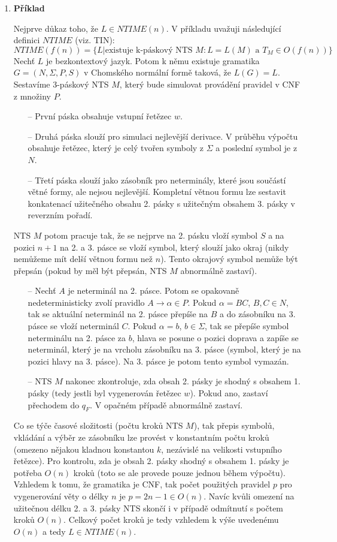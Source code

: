 \documentclass[a4paper,12pt]{article}
\begin{document}
\begin{enumerate}[label=\textbf{\arabic*}.]
 \enlargethispage{5em}
  \item {\bfseries Příklad}
  
   Nejprve důkaz toho, že $L \in NTIME(n)$. V příkladu uvažuji následující definici $NTIME$ (viz. TIN):
   $$
    NTIME(f(n)) = \{L | \mbox{existuje k-páskový NTS } M: L = L(M) \mbox{ a }T_M \in O(f(n)) \}
   $$
   Nechť $L$ je bezkontextový jazyk. Potom k němu existuje gramatika $G = (N, \Sigma, P, S)$ v Chomského normální formě taková, že 
 $L(G) = L$. Sestavíme 3-páskový NTS $M$, který bude simulovat provádění pravidel v CNF z množiny $P$.
 \begin{itemize}
  \item[--] První páska obsahuje vstupní řetězec $w$.
  \item[--] Druhá páska slouží pro simulaci nejlevější derivace. V průběhu výpočtu obsahuje řetězec, který je celý 
  tvořen symboly z $\Sigma$ a poslední symbol je z $N$.
  \item[--] Třetí páska slouží jako zásobník pro neterminály, které jsou součástí větné formy, ale nejsou nejlevější. Kompletní větnou formu 
  lze sestavit konkatenací užitečného obsahu 2. pásky s užitečným obsahem 3. pásky v reverzním pořadí.
\end{itemize}
NTS $M$ potom pracuje tak, že se nejprve na 2. pásku vloží symbol $S$ a na pozici $n + 1$ na 2. a 3. pásce se vloží symbol, který
slouží jako okraj (nikdy nemůžeme mít delší větnou formu než $n$). Tento okrajový symbol nemůže být přepsán (pokud by měl být přepsán, NTS $M$
abnormálně zastaví).
\begin{itemize}
  \item[--] Nechť $A$ je neterminál na 2. pásce. Potom se opakovaně nedeterministicky zvolí pravidlo $A\rightarrow \alpha \in P$.
  Pokud $\alpha = BC$, $B, C \in N$, tak se aktuální neterminál na 2. pásce přepíše na $B$ a do zásobníku na 3. pásce se vloží neterminál $C$.
  Pokud $\alpha = b$, $b\in\Sigma$, tak se přepíše symbol neterminálu na 2. pásce za $b$, hlava se posune o pozici doprava a zapíše se neterminál, 
  který je na vrcholu zásobníku na 3. pásce (symbol, který je na pozici hlavy na 3. pásce). Na 3. pásce je potom tento symbol vymazán.
  \item[--] NTS $M$ nakonec zkontroluje, zda obsah 2. pásky je shodný s obsahem 1. pásky (tedy jestli byl vygenerován řetězec $w$). Pokud ano, zastaví
  přechodem do $q_F$. V opačném případě abnormálně zastaví.
 \end{itemize}

 Co se týče časové složitosti (počtu kroků NTS $M$), tak přepis symbolů, vkládání a 
 výběr ze zásobníku lze provést v konstantním počtu kroků (omezeno nějakou kladnou konstantou $k$, 
 nezávislé na velikosti vstupního řetězce). Pro kontrolu, zda je obsah 2. pásky
 shodný s obsahem 1. pásky je potřeba $O(n)$ kroků (toto se ale provede pouze jednou během výpočtu). Vzhledem k 
 tomu, že gramatika je CNF, tak počet použitých pravidel $p$ pro vygenerování věty o délky $n$ je $p = 2n - 1 \in O(n)$.
 Navíc kvůli omezení na užitečnou délku 2. a 3. pásky NTS skončí i v případě odmítnutí s počtem kroků $O(n)$.
 Celkový počet kroků je tedy vzhledem k výše uvedenému $O(n)$ a tedy $L\in NTIME(n)$. 
 

\end{enumerate}
\end{document}
